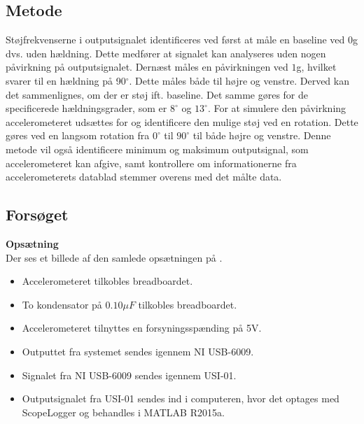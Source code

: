 \subsection{Metode}
Støjfrekvenserne i outputsignalet identificeres ved først at måle en baseline ved $0$g dvs. uden hældning. Dette medfører at signalet kan analyseres uden nogen påvirkning på outputsignalet. Dernæst måles en påvirkningen ved $1$g, hvilket svarer til en hældning på 90$^{\circ}$. Dette måles både til højre og venstre. Derved kan det sammenlignes, om der er støj ift. baseline. Det samme gøres for de specificerede hældningsgrader, som er $8^{\circ}$ og $13^{\circ}$. For at simulere den påvirkning accelerometeret udsættes for og identificere den mulige støj ved en rotation. Dette gøres ved en langsom rotation fra $0^{\circ}$ til $90^{\circ}$ til både højre og venstre. Denne metode vil også identificere minimum og maksimum outputsignal, som accelerometeret kan afgive, samt kontrollere om informationerne fra accelerometerets datablad stemmer overens med det målte data.

\subsection{Forsøget}
\textbf{Opsætning}\\
Der ses et billede af den samlede opsætningen på .
\begin{itemize}
\item Accelerometeret tilkobles breadboardet.
\item To kondensator på $0.10 \mu F$ tilkobles breadboardet. 
\item Accelerometeret tilnyttes en forsyningsspænding på 5V.
\item Outputtet fra systemet sendes igennem NI USB-6009.
\item Signalet fra NI USB-6009 sendes igennem USI-01. 
\item Outputsignalet fra USI-01 sendes ind i computeren, hvor det optages med ScopeLogger og behandles i MATLAB R2015a.
\end{itemize}

